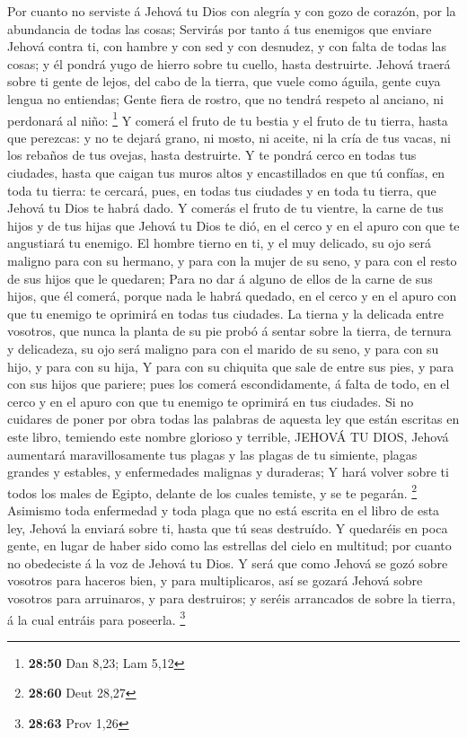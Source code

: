  Por cuanto no serviste á Jehová tu Dios con alegría y con
gozo de corazón, por la abundancia de todas las cosas; 
Servirás por tanto á tus enemigos que enviare Jehová contra ti, con
hambre y con sed y con desnudez, y con falta de todas las cosas; y él
pondrá yugo de hierro sobre tu cuello, hasta destruirte. 
Jehová traerá sobre ti gente de lejos, del cabo de la tierra, que vuele
como águila, gente cuya lengua no entiendas;  Gente fiera
de rostro, que no tendrá respeto al anciano, ni perdonará al niño:
\footnote{\textbf{28:50} Dan 8,23; Lam 5,12}  Y comerá el
fruto de tu bestia y el fruto de tu tierra, hasta que perezcas: y no te
dejará grano, ni mosto, ni aceite, ni la cría de tus vacas, ni los
rebaños de tus ovejas, hasta destruirte.  Y te pondrá cerco
en todas tus ciudades, hasta que caigan tus muros altos y encastillados
en que tú confías, en toda tu tierra: te cercará, pues, en todas tus
ciudades y en toda tu tierra, que Jehová tu Dios te habrá dado.
 Y comerás el fruto de tu vientre, la carne de tus hijos y
de tus hijas que Jehová tu Dios te dió, en el cerco y en el apuro con
que te angustiará tu enemigo.  El hombre tierno en ti, y el
muy delicado, su ojo será maligno para con su hermano, y para con la
mujer de su seno, y para con el resto de sus hijos que le quedaren;
 Para no dar á alguno de ellos de la carne de sus hijos,
que él comerá, porque nada le habrá quedado, en el cerco y en el apuro
con que tu enemigo te oprimirá en todas tus ciudades.  La
tierna y la delicada entre vosotros, que nunca la planta de su pie probó
á sentar sobre la tierra, de ternura y delicadeza, su ojo será maligno
para con el marido de su seno, y para con su hijo, y para con su hija,
 Y para con su chiquita que sale de entre sus pies, y para
con sus hijos que pariere; pues los comerá escondidamente, á falta de
todo, en el cerco y en el apuro con que tu enemigo te oprimirá en tus
ciudades.  Si no cuidares de poner por obra todas las
palabras de aquesta ley que están escritas en este libro, temiendo este
nombre glorioso y terrible, JEHOVÁ TU DIOS,  Jehová
aumentará maravillosamente tus plagas y las plagas de tu simiente,
plagas grandes y estables, y enfermedades malignas y duraderas;
 Y hará volver sobre ti todos los males de Egipto, delante
de los cuales temiste, y se te pegarán. \footnote{\textbf{28:60} Deut
  28,27}  Asimismo toda enfermedad y toda plaga que no está
escrita en el libro de esta ley, Jehová la enviará sobre ti, hasta que
tú seas destruído.  Y quedaréis en poca gente, en lugar de
haber sido como las estrellas del cielo en multitud; por cuanto no
obedeciste á la voz de Jehová tu Dios.  Y será que como
Jehová se gozó sobre vosotros para haceros bien, y para multiplicaros,
así se gozará Jehová sobre vosotros para arruinaros, y para destruiros;
y seréis arrancados de sobre la tierra, á la cual entráis para poseerla.
\footnote{\textbf{28:63} Prov 1,26}

